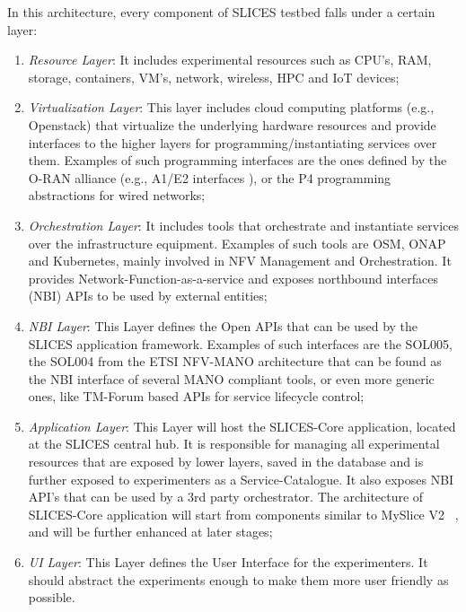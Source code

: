 In this architecture, every component of SLICES testbed falls under a certain layer:
\begin{enumerate}
    \item \textit{Resource Layer}: It includes experimental resources such as CPU’s, RAM, storage, containers, VM’s, network, wireless, HPC and IoT devices;
    \item \textit{Virtualization Layer}: This layer includes cloud computing platforms (e.g., Openstack) that virtualize the underlying hardware resources and provide interfaces to the higher layers for programming/instantiating services over them. Examples of such programming interfaces are the ones defined by the O-RAN alliance (e.g., A1/E2 interfaces ), or the P4 programming abstractions for wired networks;
    \item \textit{Orchestration Layer}: It includes tools that orchestrate and instantiate services over the infrastructure equipment. Examples of such tools are OSM, ONAP and Kubernetes, mainly involved in NFV Management and Orchestration. It provides Network-Function-as-a-service and exposes northbound interfaces (NBI) APIs to be used by external entities; 
    \item \textit{NBI Layer}: This Layer defines the Open APIs that can be used by the SLICES application framework. Examples of such interfaces are the SOL005, the SOL004 from the ETSI NFV-MANO architecture \cite{etsi013} that can be found as the NBI interface of several MANO compliant tools, or even more generic ones, like TM-Forum  based APIs for service lifecycle control;
    \item \textit{Application Layer}: This Layer will host the SLICES-Core application, located at the SLICES central hub. It is responsible for managing all experimental resources that are exposed by lower layers, saved in the database and is further exposed to experimenters as a Service-Catalogue. It also exposes NBI API’s that can be used by a 3rd party orchestrator. The architecture of SLICES-Core application will start from components similar to MySlice V2 ~\cite{baron:hal-01804013}, and will be further enhanced at later stages;
    \item \textit{UI Layer}: This Layer defines the User Interface for the experimenters. It should abstract the experiments enough to make them more user friendly as possible. 
\end{enumerate}


